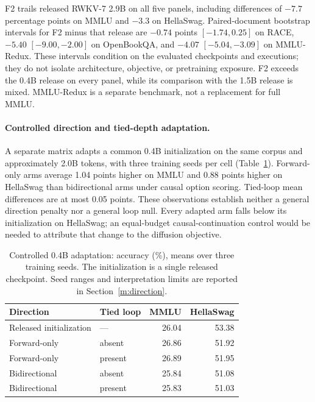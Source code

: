 F2 trails released RWKV-7 2.9B on all five panels, including differences of
$-7.7$ percentage points on MMLU and $-3.3$ on HellaSwag. Paired-document bootstrap
intervals for F2 minus that release are $-0.74$ points $[-1.74,0.25]$ on RACE,
$-5.40$ $[-9.00,-2.00]$ on OpenBookQA, and $-4.07$ $[-5.04,-3.09]$ on
MMLU-Redux. These intervals condition on the evaluated checkpoints and executions;
they do not isolate architecture, objective, or pretraining exposure. F2 exceeds the
0.4B release on every panel, while its comparison with the 1.5B release is mixed.
MMLU-Redux is a separate benchmark, not a replacement for full MMLU.

\paragraph{Controlled direction and tied-depth adaptation.}
A separate matrix adapts a common 0.4B initialization on the same corpus and approximately
2.0B tokens, with three training seeds per cell (Table~\ref{tab:main-direction}).
Forward-only arms average 1.04 points higher on MMLU and 0.88 points higher on HellaSwag
than bidirectional arms under causal option scoring. Tied-loop mean differences are
at most 0.05 points. These observations establish neither a general direction penalty
nor a general loop null. Every adapted arm falls below its initialization on HellaSwag;
an equal-budget causal-continuation control would be needed to attribute that change
to the diffusion objective.

\begin{table}[t]
\centering\small
\begin{tabular}{@{}llrr@{}}
\toprule
Direction & Tied loop & MMLU & HellaSwag\\
\midrule
Released initialization & --- & 26.04 & 53.38\\
Forward-only & absent & 26.86 & 51.92\\
Forward-only & present & 26.89 & 51.95\\
Bidirectional & absent & 25.84 & 51.08\\
Bidirectional & present & 25.83 & 51.03\\
\bottomrule
\end{tabular}
\caption{Controlled 0.4B adaptation: accuracy (\%), means over three training seeds.
The initialization is a single released checkpoint. Seed ranges and interpretation
limits are reported in Section~\ref{m:direction}.}
\label{tab:main-direction}
\end{table}

